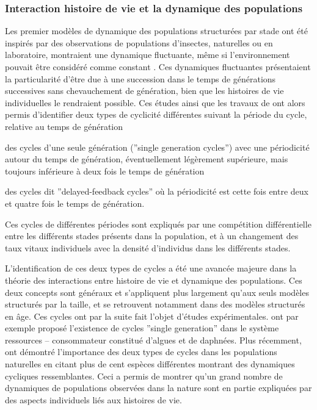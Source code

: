 \subsubsection{Interaction histoire de vie et la dynamique des populations}
\label{modelPopStru}
Les premier modèles de dynamique des populations structurées par stade
\autocite{gurney1980a,gurney1983a,nisbet1983a,lawton1981a} ont été inspirés par
des observations de populations d'insectes, naturelles ou en laboratoire,
montraient une dynamique fluctuante, même si l'environnement pouvait être
considéré comme constant
\autocite{nicholson1954a,gurney1983a,ebenman1988a,godfray1989a}. Ces dynamiques
fluctuantes présentaient la particularité d'être due à une succession dans le
temps de générations successives sans chevauchement de génération, bien que les
histoires de vie individuelles le rendraient possible. Ces études ainsi que les
travaux de \textcite{gurney1985a} ont alors permis d'identifier deux types de
cyclicité différentes suivant la période du cycle, relative au temps de
génération
\begin{enumerate*}[label=(\roman*), before=\unskip{ : }, itemjoin={{ ; }},
itemjoin*={{ ; et }}]
  \item des cycles d'une seule génération (''single generation cycles'') avec une
  périodicité autour du temps de génération, éventuellement légèrement
  supérieure, mais toujours inférieure à deux fois le temps de génération
  \item des cycles dit ''delayed-feedback cycles'' où la périodicité est cette
  fois entre deux et quatre fois le temps de génération. 
\end{enumerate*} 
Ces cycles de différentes périodes sont expliqués par une compétition
différentielle entre les différents stades présents dans la population, et à un
changement des taux vitaux individuels avec la densité d'individus dans les
différents stades.

L'identification de ces deux types de cycles a été une avancée majeure dans la
théorie des interactions entre histoire de vie et dynamique des populations. Ces
deux concepts sont généraux et s'appliquent plus largement qu'aux seuls modèles
structurés par la taille, et se retrouvent notamment dans des modèles structurés
en âge. Ces cycles ont par la suite fait l'objet d'études expérimentales.
\textcite{mccauley1987a} ont par exemple proposé l'existence de cycles ''single
generation'' dans le système ressources -- consommateur constitué d'algues et de
daphnées. Plus récemment, \textcite{murdoch2002a} ont démontré l'importance des
deux types de cycles dans les populations naturelles en citant plus de cent
espèces différentes montrant des dynamiques cycliques ressemblantes. Ceci a
permis de montrer qu'un grand nombre de dynamiques de populations observées dans
la nature sont en partie expliquées par des aspects individuels liés aux
histoires de vie.

